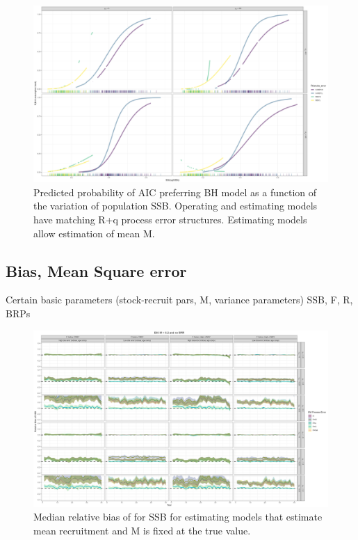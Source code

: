 \documentclass[
  12pt,
]{article}
\begin{document}
\begin{figure}
\caption{Predicted probability of AIC preferring BH model as a function of the variation of population SSB. Operating and estimating models have matching R+q process error structures. Estimating models allow estimation of mean M.}\label{q_om_ME_BH_glm_AIC_plots}
\begin{center}
\includegraphics[width = \textwidth]{q_om_ME_pred_BH_best.png}
\end{center}
\end{figure}

\clearpage

\hypertarget{bias-mean-square-error}{%
\subsection{Bias, Mean Square error}\label{bias-mean-square-error}}

Certain basic parameters (stock-recruit pars, M, variance parameters)
SSB, F, R, BRPs

\begin{landscape}
\begin{figure}
\caption{Median relative bias of for SSB for estimating models that estimate mean recruitment and M is fixed at the true value.}\label{naa_om_em_R_MF_relbias_ssb}
\begin{center}
\includegraphics[width = \textwidth]{naa_om_R_MF_relbias_ssb.png}
\end{center}
\end{figure}
\end{landscape}
\end{document}

